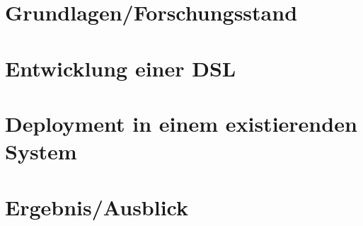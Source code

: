 \documentclass [11pt, a4paper]{report}
\begin{document}
\newenvironment{myquote}%
{\begin{quote}\small}%
{\end{quote}}%


\pagestyle{headings}
\tableofcontents


\pagestyle{headings}






\chapter{Grundlagen/Forschungsstand}


\chapter{Entwicklung einer DSL}
\label{cha:entwicklung-einer-dsl}


\chapter{Deployment in einem existierenden System}


\chapter{Ergebnis/Ausblick}















\end{document}
